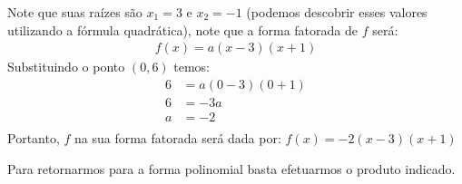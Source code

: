 Note que suas raízes são \(x_1=3\) e \(x_2=-1\) (podemos descobrir esses valores utilizando a fórmula quadrática), note que a forma fatorada de \(f\) será:
\begin{equation*}
\begin{split}f(x)=a(x-3)(x+1)\end{split}
\end{equation*}
Substituindo o ponto \((0,6)\) temos:
\begin{align*}
6&=a(0-3)(0+1)\\
6&=-3a\\
a&=-2\\
\end{align*}
Portanto, \(f\) na sua forma fatorada será dada por: \(f(x)=-2(x-3)(x+1)\)

Para retornarmos para a forma polinomial basta efetuarmos o produto indicado.

